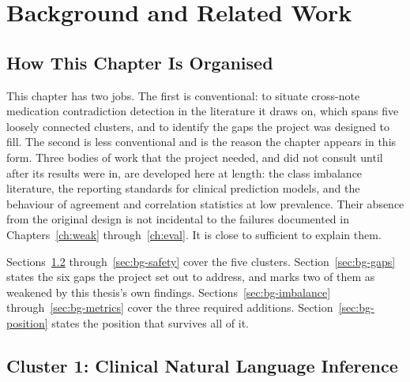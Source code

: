 %
%

\chapter{Background and Related Work}
\label{ch:background}

\section{How This Chapter Is Organised}
\label{sec:bg-overview}

This chapter has two jobs. The first is conventional: to situate cross-note
medication contradiction detection in the literature it draws on, which spans
five loosely connected clusters, and to identify the gaps the project was
designed to fill. The second is less conventional and is the reason the chapter
appears in this form. Three bodies of work that the project needed, and did not
consult until after its results were in, are developed here at length: the class
imbalance literature, the reporting standards for clinical prediction models,
and the behaviour of agreement and correlation statistics at low prevalence.
Their absence from the original design is not incidental to the failures
documented in Chapters~\ref{ch:weak} through~\ref{ch:eval}. It is close to
sufficient to explain them.

Sections~\ref{sec:bg-nli} through~\ref{sec:bg-safety} cover the five clusters.
Section~\ref{sec:bg-gaps} states the six gaps the project set out to address,
and marks two of them as weakened by this thesis's own findings.
Sections~\ref{sec:bg-imbalance} through~\ref{sec:bg-metrics} cover the three
required additions. Section~\ref{sec:bg-position} states the position that
survives all of it.

\section{Cluster 1: Clinical Natural Language Inference}
\label{sec:bg-nli}

